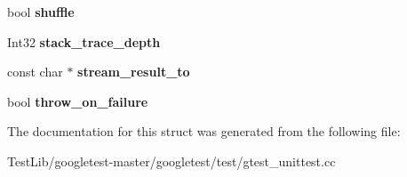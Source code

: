 \begin{DoxyCompactItemize}
bool {\bfseries shuffle}
\item 
\mbox{\label{structtesting_1_1Flags_a20c6592453909c1adace64bf6a2bc2de}} 
Int32 {\bfseries stack\+\_\+trace\+\_\+depth}
\item 
\mbox{\label{structtesting_1_1Flags_ab09849fd3e095d5628dec65ec4dce9e1}} 
const char $\ast$ {\bfseries stream\+\_\+result\+\_\+to}
\item 
\mbox{\label{structtesting_1_1Flags_ab8e7d21e31e641efe47b8050759e001a}} 
bool {\bfseries throw\+\_\+on\+\_\+failure}
\end{DoxyCompactItemize}


The documentation for this struct was generated from the following file\+:\begin{DoxyCompactItemize}
\item 
Test\+Lib/googletest-\/master/googletest/test/gtest\+\_\+unittest.\+cc\end{DoxyCompactItemize}
